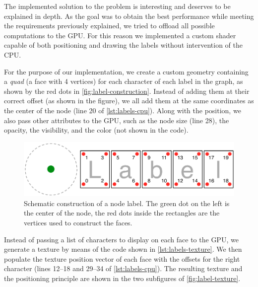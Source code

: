 The implemented solution to the problem is interesting and deserves to be explained in depth. As the goal was to obtain the best performance while meeting the requirements previously explained, we tried to offload all possible computations to the GPU. For this reason we implemented a custom shader capable of both positioning and drawing the labels without intervention of the CPU.

For the purpose of our implementation, we create a custom geometry containing a \emph{quad} (a face with 4 vertices) for each character of each label in the graph, as shown by the red dots in \vref{fig:label-construction}. Instead of adding them at their correct offset (as shown in the figure), we all add them at the same coordinates as the center of the node (line 20 of \vref{lst:labels-cpu}). Along with the position, we also pass other attributes to the GPU, such as the node size (line 28), the opacity, the visibility, and the color (not shown in the code).

\begin{figure}
  \centering
  \includegraphics[width=.8\linewidth]{images/label-construction}
  \caption[Construction of the label for a node.]{Schematic construction of a node label. The green dot on the left is the center of the node, the red dots inside the rectangles are the vertices used to construct the faces.}
  \label{fig:label-construction}
\end{figure}

Instead of passing a list of characters to display on each face to the GPU, we generate a texture by means of the code shown in \ref{lst:labels-texture}. We then populate the texture position vector of each face with the offsets for the right character (lines 12--18 and 29--34 of \ref{lst:labels-cpu}). The resulting texture and the positioning principle are shown in the two subfigures of \vref{fig:label-texture}.


